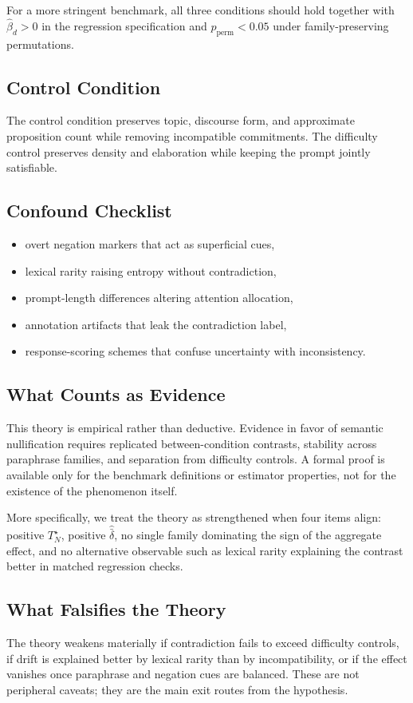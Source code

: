 \documentclass{svjour3}
\begin{document}
For a more stringent benchmark, all three conditions should hold together with $\widehat{\beta}_d>0$ in the regression specification and $p_{\mathrm{perm}}<0.05$ under family-preserving permutations.

\subsection{Control Condition}
The control condition preserves topic, discourse form, and approximate proposition count while removing incompatible commitments. The difficulty control preserves density and elaboration while keeping the prompt jointly satisfiable.

\subsection{Confound Checklist}
\begin{itemize}[leftmargin=*]
\item overt negation markers that act as superficial cues,
\item lexical rarity raising entropy without contradiction,
\item prompt-length differences altering attention allocation,
\item annotation artifacts that leak the contradiction label,
\item response-scoring schemes that confuse uncertainty with inconsistency.
\end{itemize}

\subsection{What Counts as Evidence}
This theory is empirical rather than deductive. Evidence in favor of semantic nullification requires replicated between-condition contrasts, stability across paraphrase families, and separation from difficulty controls. A formal proof is available only for the benchmark definitions or estimator properties, not for the existence of the phenomenon itself.

More specifically, we treat the theory as strengthened when four items align: positive $T_N^{\star}$, positive $\widehat{\bar{\delta}}$, no single family dominating the sign of the aggregate effect, and no alternative observable such as lexical rarity explaining the contrast better in matched regression checks.

\subsection{What Falsifies the Theory}
The theory weakens materially if contradiction fails to exceed difficulty controls, if drift is explained better by lexical rarity than by incompatibility, or if the effect vanishes once paraphrase and negation cues are balanced. These are not peripheral caveats; they are the main exit routes from the hypothesis.
\end{document}

